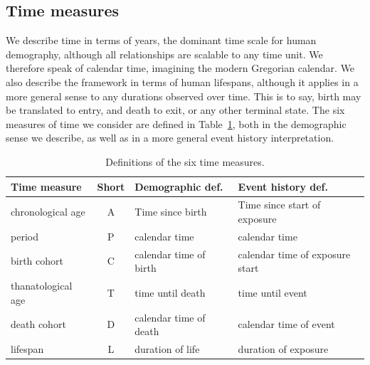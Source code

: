 \documentclass[12pt,oneside,a4paper]{article} %
\begin{document}

\FloatBarrier
\subsection{Time measures}
\FloatBarrier
We describe time in terms of years, the dominant time scale for human
demography, although all relationships are scalable to any time unit. We therefore speak of calendar time,
imagining the modern Gregorian calendar. We also describe the framework in terms
of human lifespans, although it applies in a more general sense to any durations
observed over time. This is to say, birth may be translated to entry, and death
to exit, or any other terminal state. The six measures of time we consider are
defined in Table~\ref{tab:sixdefs}, both in the demographic sense we describe, as well as in a more general event history interpretation.


\begin{table}
\centering
\caption{Definitions of the six time measures.}
\label{tab:sixdefs}
\begin{adjustwidth}{0em}{0em}
\begin{tabular}{lcll}
\hline 
\textbf{Time measure} & \textbf{Short} & \textbf{Demographic def.} &
\textbf{Event history def.}\\
\hline 
chronological age & A & Time since birth & Time since start of exposure \\
period & P & calendar time & calendar time \\
birth cohort & C & calendar time of birth & calendar time of exposure start \\
thanatological age & T & time until death & time until event \\
death cohort & D & calendar time of death & calendar time of event \\
lifespan & L & duration of life & duration of exposure \\
\end{tabular}
\end{adjustwidth}
\end{table}
\end{document}
